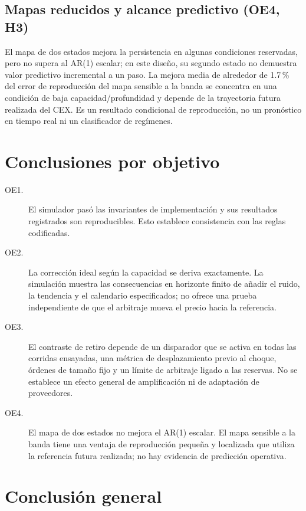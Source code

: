 \subsection{Mapas reducidos y alcance predictivo (OE4, H3)}

El mapa de dos estados mejora la persistencia en algunas condiciones reservadas, pero no supera al AR(1) escalar; en este diseño, su segundo estado no demuestra valor predictivo incremental a un paso. La mejora media de alrededor de 1.7\,\% del error de reproducción del mapa sensible a la banda se concentra en una condición de baja capacidad/profundidad y depende de la trayectoria futura realizada del CEX. Es un resultado condicional de reproducción, no un pronóstico en tiempo real ni un clasificador de regímenes.

\section{Conclusiones por objetivo}

\begin{description}
  \item[OE1.] El simulador pasó las invariantes de implementación y sus resultados registrados son reproducibles. Esto establece consistencia con las reglas codificadas.
  \item[OE2.] La corrección ideal según la capacidad se deriva exactamente. La simulación muestra las consecuencias en horizonte finito de añadir el ruido, la tendencia y el calendario especificados; no ofrece una prueba independiente de que el arbitraje mueva el precio hacia la referencia.
  \item[OE3.] El contraste de retiro depende de un disparador que se activa en todas las corridas ensayadas, una métrica de desplazamiento previo al choque, órdenes de tamaño fijo y un límite de arbitraje ligado a las reservas. No se establece un efecto general de amplificación ni de adaptación de proveedores.
  \item[OE4.] El mapa de dos estados no mejora el AR(1) escalar. El mapa sensible a la banda tiene una ventaja de reproducción pequeña y localizada que utiliza la referencia futura realizada; no hay evidencia de predicción operativa.
\end{description}

\section{Conclusión general}

